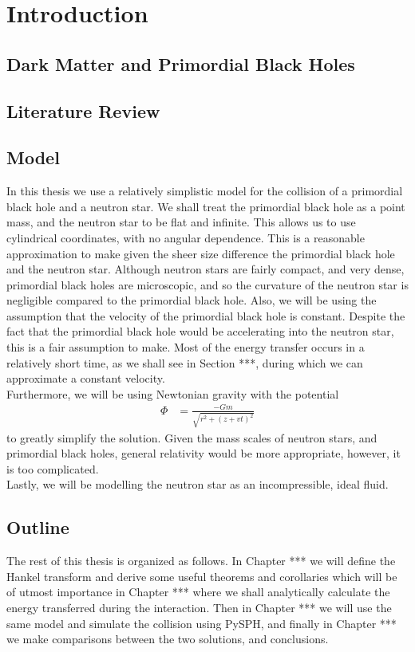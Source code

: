 \documentclass[12pt]{report}
\begin{document}
\doublespacing
\linespread{2}

\chapter{Introduction}

\section{Dark Matter and Primordial Black Holes}

\section{Literature Review}

\section{Model}

In this thesis we use a relatively simplistic model for the collision of a primordial black hole and a neutron star. We shall treat the primordial black hole as a point mass, and the neutron star to be flat and infinite. This allows us to use cylindrical coordinates, with no angular dependence. This is a reasonable approximation to make given the sheer size difference the primordial black hole and the neutron star. Although neutron stars are fairly compact, and very dense, primordial black holes are microscopic, and so the curvature of the neutron star is negligible compared to the primordial black hole. Also, we will be using the assumption that the velocity of the primordial black hole is constant. Despite the fact that the primordial black hole would be accelerating into the neutron star, this is a fair assumption to make. Most of the energy transfer occurs in a relatively short time, as we shall see in Section ***, during which we can approximate a constant velocity. \\

Furthermore, we will be using Newtonian gravity with the potential
\begin{align}
\label{eq:gravity}
\Phi &= \frac{-Gm}{\sqrt{r^2 + (z + vt)^2}}
\end{align}
to greatly simplify the solution. Given the mass scales of neutron stars, and primordial black holes, general relativity would be more appropriate, however, it is too complicated. \\

Lastly, we will be modelling the neutron star as an incompressible, ideal fluid.

\section{Outline}

The rest of this thesis is organized as follows. In Chapter *** we will define the Hankel transform and derive some useful theorems and corollaries which will be of utmost importance in Chapter *** where we shall analytically calculate the energy transferred during the interaction. Then in Chapter *** we will use the same model and simulate the collision using PySPH, and finally in Chapter *** we make comparisons between the two solutions, and conclusions.
\end{document}
